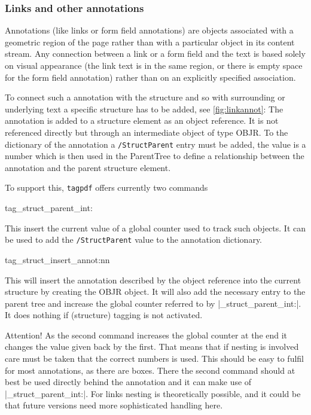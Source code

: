 \documentclass[DIV=12,parskip=half-,bibliography=totoc]{scrartcl}
\newcommand\pkg[1]{\texttt{#1}}
\begin{document}
\subsubsection{Links and other annotations}

Annotations (like links or form field annotations) are objects associated with a geometric region of the page rather than with a particular object in its content stream. Any connection between a link or a form field and the text is based solely on visual appearance (the link text is in the same region, or there is empty space for the form field annotation) rather than on an explicitly specified association.

To connect such a annotation with the structure and so with surrounding or underlying text a specific structure has to be added, see \ref{fig:linkannot}:
The annotation is added to a structure element as an object reference. It is not referenced directly but through an intermediate object of type OBJR. To the dictionary of the annotation a \texttt{/StructParent} entry must be added, the value is a number which is then
used in the ParentTree to define a relationship between the annotation and the parent structure element.

To support this, \pkg{tagpdf} offers currently two commands

\begin{docCommand}{tag_struct_parent_int:}{}\end{docCommand}

This insert the current value of a global counter used to track such objects. It can be used to add the \texttt{/StructParent} value to
the annotation dictionary.

\begin{docCommand}{tag_struct_insert_annot:nn}{}\end{docCommand}

This will insert the annotation described by the object reference into the current structure by creating the OBJR object. It will
also add the necessary entry to the parent tree and increase the global counter referred to by |\tag_struct_parent_int:|.
It does nothing if (structure) tagging is not activated.

Attention! As the second command increases the global counter at the end it changes the value given back by the first.
That means that if nesting is involved care must be taken that the correct numbers is used. This should be easy to fulfil for most annotations, as there are boxes.
There the second command should at best be used directly behind the annotation and it can make use of |\tag_struct_parent_int:|. For links nesting is theoretically possible, and it
could be that future versions need more sophisticated handling here.
\end{document}
